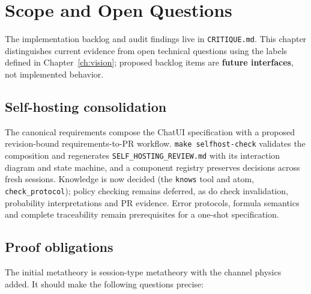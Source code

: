 \chapter{Scope and Open Questions}
\label{ch:roadmap}

The implementation backlog and audit findings live in \texttt{CRITIQUE.md}.
This chapter distinguishes current evidence from open technical questions using
the labels defined in Chapter~\ref{ch:vision}; proposed backlog items are
\textbf{future interfaces}, not implemented behavior.

\section*{Self-hosting consolidation}

The canonical requirements compose the ChatUI specification with a proposed
revision-bound requirements-to-PR workflow. \texttt{make selfhost-check} validates
the composition and regenerates \texttt{SELF\_HOSTING\_REVIEW.md} with its
interaction diagram and state machine, and a component registry preserves
decisions across fresh sessions. Knowledge is now decided (the \texttt{knows} tool
and atom, \texttt{check\_protocol}); policy checking remains deferred, as do
check invalidation, probability interpretations and PR evidence. Error protocols,
formula semantics and complete traceability remain prerequisites for a one-shot
specification.

\section{Proof obligations}

The initial metatheory is session-type metatheory with the channel physics
added. It should make the following questions precise:

